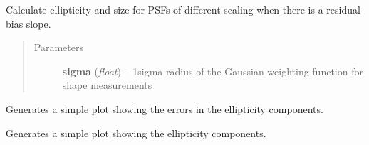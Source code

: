\documentclass[a4paper,11pt,english]{sphinxmanual}
\begin{document}

\begin{fulllineitems}
\label{reduction:analysis.biasCalibration.findTolerableErrorSlope}
Calculate ellipticity and size for PSFs of different scaling when there is a residual
bias slope.
\begin{quote}\begin{description}
\item[{Parameters}] \leavevmode
\textbf{sigma} (\emph{float}) -- 1sigma radius of the Gaussian weighting function for shape measurements

\end{description}\end{quote}

\end{fulllineitems}


\begin{fulllineitems}
\label{reduction:analysis.biasCalibration.pistonKnowledge}
\end{fulllineitems}


\begin{fulllineitems}
\label{reduction:analysis.biasCalibration.plotDeltaEs}
Generates a simple plot showing the errors in the ellipticity components.

\end{fulllineitems}


\begin{fulllineitems}
\label{reduction:analysis.biasCalibration.plotEs}
Generates a simple plot showing the ellipticity components.

\end{fulllineitems}
\end{document}
